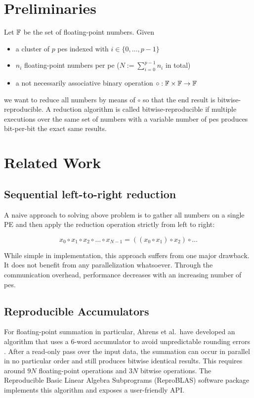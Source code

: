 \section{Preliminaries}
\label{sec:Preliminaries}
Let $\mathbb{F}$ be the set of floating-point numbers. Given
\begin{itemize}
\item a cluster of $p$ \glspl{pe} indexed with $i \in \{0, \ldots, p - 1\}$
\item $n_i$ floating-point numbers per \gls{pe} ($N := \sum_{i=0}^{p-1} n_i$ in total)
\item a not necessarily associative binary operation $\circ: \mathbb{F} \times \mathbb{F} \rightarrow \mathbb{F}$
\end{itemize}
we want to reduce all numbers by means of $\circ$ so that the end result is bitwise-reproducible.
A reduction algorithm is called bitwise-reproducible if multiple executions over the same set of numbers with a variable
number of \glspl{pe} produces bit-per-bit the exact same results.


\section{Related Work}
\label{sec:RelatedWork}

\subsection{Sequential left-to-right reduction}
\label{sec:SequentialLeftToRightReduction}


A naive approach to solving above problem is to gather all numbers on a single PE and then apply the reduction
operation strictly from left to right:

\begin{equation}
x_0 \circ x_1 \circ x_2 \circ \ldots  \circ x_{N-1} = ((x_0 \circ x_1) \circ x_2) \circ \ldots
\end{equation}

While simple in implementation, this approach suffers from one major drawback. It does not benefit from any
parallelization whatsoever. Through the communication overhead, performance decreases with
an increasing number of \glspl{pe}.


\subsection{Reproducible Accumulators}
\label{sec:Reproducible Accumulators}
For floating-point summation in particular, Ahrens et al.\ have developed an algorithm that uses a 6-word accumulator
to avoid unpredictable rounding errors \cite{ahrens_algorithms_2020}. After a read-only pass over the input data,
the summation can occur in parallel in no particular order and still produces bitwise identical results.
This requires around $9N$ floating-point operations and $3N$ bitwise operations.
The Reproducible Basic Linear Algebra Subprograms (ReproBLAS) software package implements this algorithm and
exposes a user-friendly API.\@

